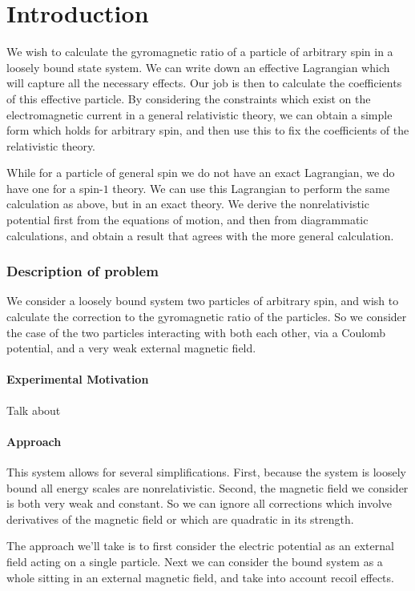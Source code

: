 \chapter{Introduction}
We wish to calculate the gyromagnetic ratio of a particle of arbitrary spin in a loosely bound state system.  We can write down an effective Lagrangian which will capture all the necessary effects.  Our job is then to calculate the coefficients of this effective particle.  By considering the constraints which exist on the electromagnetic current in a general relativistic theory, we can obtain a simple form which holds for arbitrary spin, and then use this to fix the coefficients of the relativistic theory.

While for a particle of general spin we do not have an exact Lagrangian, we do have one for a spin-$1$ theory.  We can use this Lagrangian to perform the same calculation as above, but in an exact theory.  We derive the nonrelativistic potential first from the equations of motion, and then from diagrammatic calculations, and obtain a result that agrees with the more general calculation.  
\subsection{Description of problem}
We consider a loosely bound system two particles of arbitrary spin, and wish to calculate the correction to the gyromagnetic ratio of the particles.  So we consider the case of the two particles interacting with both each other, via a Coulomb potential, and a very weak external magnetic field.
\subsubsection{Experimental Motivation}

Talk about 


\subsubsection{Approach}
This system allows for several simplifications.  First, because the system is loosely bound all energy scales are nonrelativistic.  
Second, the magnetic field we consider is both very weak and constant.  So we can ignore all corrections which involve derivatives of the magnetic field or which are quadratic in its strength.

The approach we'll take is to first consider the electric potential as an external field acting on a single particle.  Next we can consider the bound system as a whole sitting in an external magnetic field, and take into account recoil effects.

